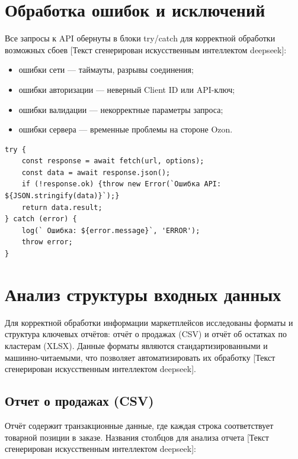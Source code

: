 \section{Обработка ошибок и исключений}
Все запросы к API обернуты в блоки try/catch для корректной обработки возможных сбоев [Текст сгенерирован искусственным интеллектом deepseek]:
\begin{itemize}
\item ошибки сети — таймауты, разрывы соединения;
\item ошибки авторизации — неверный Client ID или API-ключ;
\item ошибки валидации — некорректные параметры запроса;
\item ошибки сервера — временные проблемы на стороне Ozon.
\end{itemize}

\begin{code}
\label{code:TryCatch}
\vspace{-0.75cm}\begin{verbatim}
try {
    const response = await fetch(url, options);
    const data = await response.json();
    if (!response.ok) {throw new Error(`Ошибка API: ${JSON.stringify(data)}`);}
    return data.result;
} catch (error) {
    log(` Ошибка: ${error.message}`, 'ERROR');
    throw error;
}
\end{verbatim}
\end{code}

\section{Анализ структуры входных данных}
Для корректной обработки информации маркетплейсов исследованы форматы и структура ключевых отчётов: отчёт о продажах (CSV) и отчёт об остатках по кластерам (XLSX). Данные форматы являются стандартизированными и машинно-читаемыми, что позволяет автоматизировать их обработку [Текст сгенерирован искусственным интеллектом deepseek].

\subsection{Отчет о продажах (CSV)}

Отчёт содержит транзакционные данные, где каждая строка соответствует товарной позиции в заказе. Названия столбцов для анализа отчета [Текст сгенерирован искусственным интеллектом deepseek]:

